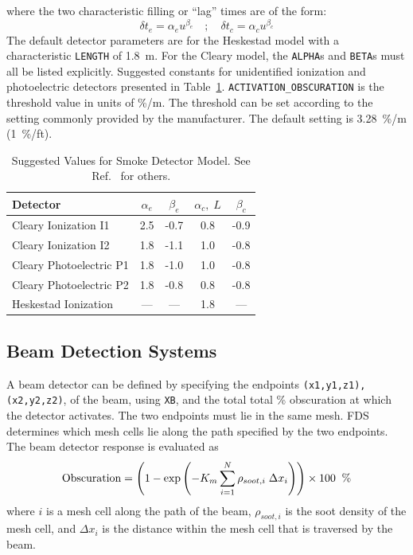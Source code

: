 \documentclass[11pt]{book}
\newcommand{\ct}{\tt\small}
\newcommand{\be}{\begin{equation}}
\newcommand{\ee}{\end{equation}}
\begin{document}
\normalsize
\noindent
where the two characteristic filling or ``lag'' times are of the form:
\be \delta t_e = \alpha_e u^{\beta_e} \quad ; \quad \delta t_c = \alpha_c u^{\beta_c} \ee
The default detector parameters are for the Heskestad model with a characteristic {\ct LENGTH} of
1.8~m. For the Cleary model, the {\ct ALPHA}s and {\ct BETA}s must all be listed explicitly.
Suggested constants for unidentified ionization and photoelectric detectors
presented in Table~\ref{tab:sdvalues}.
{\ct ACTIVATION\_OBSCURATION} is the threshold value in units of \%/m.
The threshold can be set according to the setting commonly provided by the manufacturer.
The default setting is 3.28~\%/m (1~\%/ft).

\begin{table}[ht]
\caption{Suggested Values for Smoke Detector Model. See Ref.~\cite{SFPE} for others.}
\vspace{0.1in}
\label{tab:sdvalues}
\begin{center}
\begin{tabular}{|l||c|c|c|c|}
\hline
Detector                      & $\alpha_e$  &  $\beta_e$   &  $\alpha_c, \; L$   &  $\beta_c$  \\ \hline \hline
Cleary Ionization    I1       & 2.5         & -0.7         &  0.8                &  -0.9      \\ \hline
Cleary Ionization    I2       & 1.8         & -1.1         &  1.0                &  -0.8      \\ \hline
Cleary Photoelectric P1       & 1.8         & -1.0         &  1.0                &  -0.8      \\ \hline
Cleary Photoelectric P2       & 1.8         & -0.8         &  0.8                &  -0.8      \\ \hline
Heskestad Ionization          & ---         & ---          &  1.8                &  ---       \\ \hline\end{tabular}
\end{center}
\end{table}


\subsection{Beam Detection Systems}
\label{info:beam_detector}

A beam detector can be defined by specifying the endpoints {\ct (x1,y1,z1),(x2,y2,z2)}, of the beam, using {\ct XB}, and the total
total \% obscuration at which the detector activates.  The two endpoints must lie in the same mesh.  FDS determines which mesh
cells lie along the path specified by the two endpoints.  The beam detector response is evaluated as
\be
  \hbox{Obscuration}  = \left(1 - \exp \left( -K_m \sum_{i=1}^N {\rho_{soot,i}\; \Delta x_i} \right)  \right) \times 100  \; \; \hbox{\%}
\ee
where $i$ is a mesh cell along the path of the beam, $\rho_{soot,i}$ is the soot density of the mesh cell, and $ \Delta x_i$
is the distance within the mesh cell that is traversed by the beam.
\end{document}
